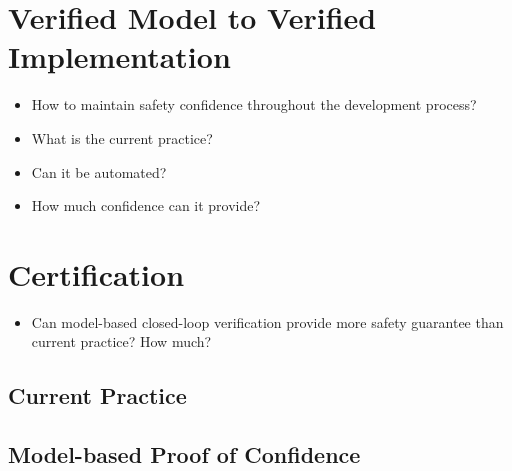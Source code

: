 \chapter{Verified Model to Verified Implementation}
\begin{itemize}
        
            \item How to maintain safety confidence throughout the development process? 
            \item What is the current practice?
            \item Can it be automated?
            \item How much confidence can it provide?
\end{itemize}

\chapter{Certification}
\begin{itemize}
          	\item Can model-based closed-loop verification provide more safety guarantee than current practice? How much?
          \end{itemize}
\section{Current Practice}
\section{Model-based Proof of Confidence}
